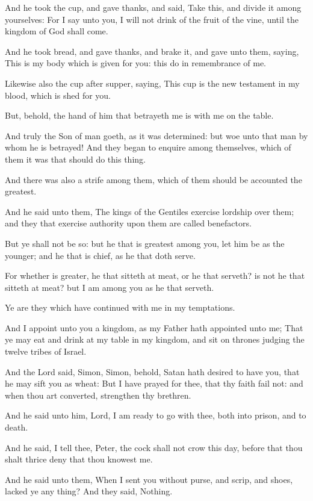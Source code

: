 \Verse And he took the cup, and gave thanks, and said, Take this, and divide it among yourselves: \Verse For I say unto you, I will not drink of the fruit of the vine, until the kingdom of God shall come.

\Verse And he took bread, and gave thanks, and brake it, and gave unto them, saying, This is my body which is given for you: this do in remembrance of me.

\Verse Likewise also the cup after supper, saying, This cup is the new testament in my blood, which is shed for you.

\Verse But, behold, the hand of him that betrayeth me is with me on the table.

\Verse And truly the Son of man goeth, as it was determined: but woe unto that man by whom he is betrayed!  \Verse And they began to enquire among themselves, which of them it was that should do this thing.

\Verse And there was also a strife among them, which of them should be accounted the greatest.

\Verse And he said unto them, The kings of the Gentiles exercise lordship over them; and they that exercise authority upon them are called benefactors.

\Verse But ye shall not be so: but he that is greatest among you, let him be as the younger; and he that is chief, as he that doth serve.

\Verse For whether is greater, he that sitteth at meat, or he that serveth?  is not he that sitteth at meat? but I am among you as he that serveth.

\Verse Ye are they which have continued with me in my temptations.

\Verse And I appoint unto you a kingdom, as my Father hath appointed unto me; \Verse That ye may eat and drink at my table in my kingdom, and sit on thrones judging the twelve tribes of Israel.

\Verse And the Lord said, Simon, Simon, behold, Satan hath desired to have you, that he may sift you as wheat: \Verse But I have prayed for thee, that thy faith fail not: and when thou art converted, strengthen thy brethren.

\Verse And he said unto him, Lord, I am ready to go with thee, both into prison, and to death.

\Verse And he said, I tell thee, Peter, the cock shall not crow this day, before that thou shalt thrice deny that thou knowest me.

\Verse And he said unto them, When I sent you without purse, and scrip, and shoes, lacked ye any thing? And they said, Nothing.

